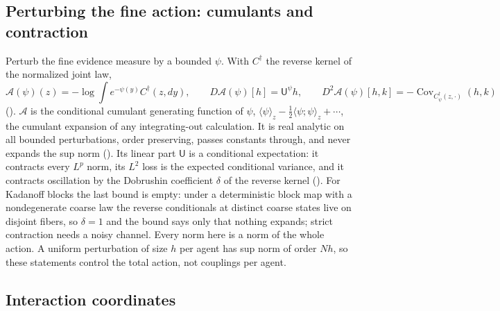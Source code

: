 \subsection{Perturbing the fine action: cumulants and contraction}

Perturb the fine evidence measure by a bounded $\psi$. With $C^\dagger$ the reverse kernel of the
normalized joint law,
\[
\mathcal A(\psi)(z)=-\log\int e^{-\psi(y)}C^\dagger(z,dy),
\qquad
D\mathcal A(\psi)[h]=\mathsf U^\psi h,
\qquad
D^2\mathcal A(\psi)[h,k]=-\operatorname{Cov}_{C^\dagger_\psi(z,\cdot)}(h,k)
\]
(). $\mathcal A$ is the conditional cumulant generating function of
$\psi$, $\langle\psi\rangle_z-\tfrac12\langle\psi;\psi\rangle_z+\cdots$, the cumulant expansion of any
integrating-out calculation. It is real analytic on all bounded perturbations, order preserving,
passes constants through, and never expands the sup norm
(). Its linear part $\mathsf U$ is a conditional
expectation: it contracts every $L^p$ norm, its $L^2$ loss is the expected conditional variance, and
it contracts oscillation by the Dobrushin coefficient $\delta$ of the reverse kernel
\citep{Dobrushin1956} (). For Kadanoff blocks the last bound is
empty: under a deterministic block map with a nondegenerate coarse law the reverse conditionals at
distinct coarse states live on disjoint fibers, so $\delta=1$ and the bound says only that nothing
expands; strict contraction needs a noisy channel. Every norm here is a norm of the whole action. A
uniform perturbation of size $h$ per agent has sup norm of order $Nh$, so these statements control
the total action, not couplings per agent.

\subsection{Interaction coordinates}

